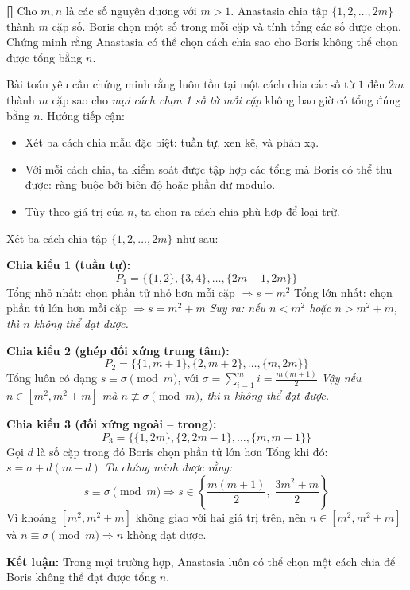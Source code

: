 \documentclass[../09-contruction-methods.tex]{subfiles}
\begin{document}
\begin{example*}\label{example:EGMO-2015-P5}\textbf{[]}
	Cho \( m, n \) là các số nguyên dương với \( m > 1 \). Anastasia chia tập \( \{1, 2, \dots, 2m\} \) thành \( m \) cặp số.
	Boris chọn một số trong mỗi cặp và tính tổng các số được chọn.
	Chứng minh rằng Anastasia có thể chọn cách chia sao cho Boris không thể chọn được tổng bằng \( n \).
\end{example*}

\begin{story*}
	Bài toán yêu cầu chứng minh rằng luôn tồn tại một cách chia các số từ \( 1 \) đến \( 2m \) thành \( m \) cặp sao cho \textit{mọi cách chọn 1 số từ mỗi cặp} không bao giờ có tổng đúng bằng \( n \). Hướng tiếp cận:
	\begin{itemize}[topsep=0pt, partopsep=0pt, itemsep=0pt]
		\item Xét ba cách chia mẫu đặc biệt: tuần tự, xen kẽ, và phản xạ.
		\item Với mỗi cách chia, ta kiểm soát được tập hợp các tổng mà Boris có thể thu được: ràng buộc bởi biên độ hoặc phần dư modulo.
		\item Tùy theo giá trị của \( n \), ta chọn ra cách chia phù hợp để loại trừ.
	\end{itemize}
\end{story*}

\bigbreak

\begin{soln}\footnotemark
	Xét ba cách chia tập \( \{1, 2, \dots, 2m\} \) như sau:

	\textbf{Chia kiểu 1 (tuần tự):}
	\[
		P_1 = \{ \{1,2\}, \{3,4\}, \dots, \{2m - 1, 2m\} \}
	\]
	Tổng nhỏ nhất: chọn phần tử nhỏ hơn mỗi cặp \( \Rightarrow s = m^2 \)  
	Tổng lớn nhất: chọn phần tử lớn hơn mỗi cặp \( \Rightarrow s = m^2 + m \)  
	\textit{Suy ra: nếu \( n < m^2 \) hoặc \( n > m^2 + m \), thì \( n \) không thể đạt được.}

	\textbf{Chia kiểu 2 (ghép đối xứng trung tâm):}
	\[
		P_2 = \{ \{1, m+1\}, \{2, m+2\}, \dots, \{m, 2m\} \}
	\]
	Tổng luôn có dạng \( s \equiv \sigma \pmod{m} \), với \( \sigma = \sum_{i=1}^{m} i = \frac{m(m+1)}{2} \)  
	\textit{Vậy nếu \( n \in [m^2, m^2 + m] \) mà \( n \not\equiv \sigma \pmod{m} \), thì \( n \) không thể đạt được.}

	\textbf{Chia kiểu 3 (đối xứng ngoài – trong):}
	\[
		P_3 = \{ \{1, 2m\}, \{2, 2m - 1\}, \dots, \{m, m+1\} \}
	\]
	Gọi \( d \) là số cặp trong đó Boris chọn phần tử lớn hơn  
	Tổng khi đó: \( s = \sigma + d(m - d) \)  
	\textit{Ta chứng minh được rằng:}  
	\[ s \equiv \sigma \pmod{m} \Rightarrow s \in \left\{ \frac{m(m+1)}{2}, \; \frac{3m^2 + m}{2} \right\} \]
	Vì khoảng \( [m^2, m^2 + m] \) không giao với hai giá trị trên, nên \( n \in [m^2, m^2 + m] \) và \( n \equiv \sigma \pmod{m} \Rightarrow n \) không đạt được.

	\textbf{Kết luận:} Trong mọi trường hợp, Anastasia luôn có thể chọn một cách chia để Boris không thể đạt được tổng \( n \).
\end{soln}

\end{document}
